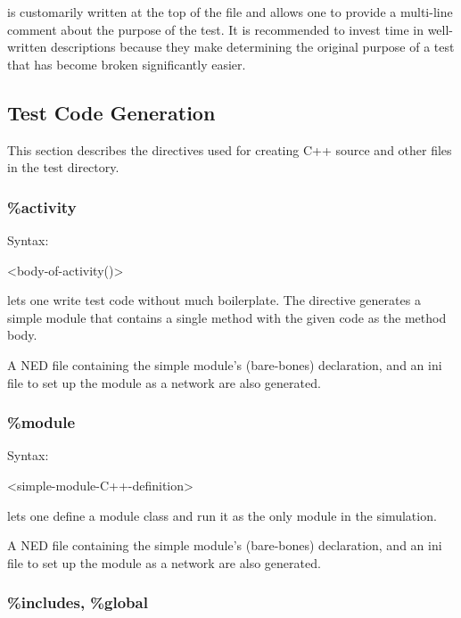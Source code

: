  is customarily written at the top of the 
file and allows one to provide a multi-line comment about the purpose of the
test. It is recommended to invest time in well-written descriptions because they make
determining the original purpose of a test that has become broken significantly easier.

\subsection{Test Code Generation}
\label{sec:testing:opptest:test-code-generation}

This section describes the directives used for creating C++ source and
other files in the test directory.

\subsubsection{\%activity}
\label{sec:testing:opptest:activity}

Syntax:

\begin{filelisting}
<body-of-activity()>
\end{filelisting}

 lets one write test code without much boilerplate. The
directive generates a simple module that contains a single 
method with the given code as the method body.

A NED file containing the simple module's (bare-bones) declaration, and an
ini file to set up the module as a network are also generated.


\subsubsection{\%module}
\label{sec:testing:opptest:module}

Syntax:

\begin{filelisting}
<simple-module-C++-definition>
\end{filelisting}

 lets one define a module class and run it as the only module
in the simulation.

A NED file containing the simple module's (bare-bones) declaration, and an
ini file to set up the module as a network are also generated.


\subsubsection{\%includes, \%global}
\label{sec:testing:opptest:includes-and-global}

